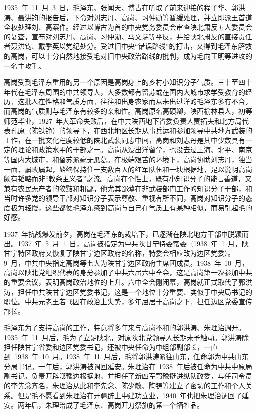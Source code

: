 1935~年~11~月~3~日，毛泽东、张闻天、博古在听取了前来迎接的程子华、郭洪涛、聂洪钧的报告后，下令对刘志丹、高岗、习仲勋等暂缓处理，并立即派王首道全权处理刘、高案件。经过以博古为首的中央党务委员会审查陕北肃反五人委员会的复查，宣布对刘志丹、高岗、习仲勋、马文瑞等平反，并给陕北肃反的直接责任者聂洪钧、戴季英以党纪处分。受过旧中央“错误路线”的打击，又得到毛泽东解救的高岗，可以十分自然地接受毛对旧中央政治路线的批判，成为毛向王明等进攻的一名主攻手。

高岗受到毛泽东重用的另一个原因是高岗身上的乡村小知识分子气质。三十至四十年代在毛泽东周围的中共领导人，大多数都有留苏或在国内大城市求学受教育的经历，这批人在性格和气质方面，往往和出身农家而从未出过洋的毛泽东多有不合，而高岗的气质则与毛泽东有较多的亲和性。高岗原名高硕卿，陕西榆林县人，初等师范毕业，1927~年大革命失败后，在中共陕西地下省委负责人贾拓夫和北方局代表孔原（陈铁铮）的领导下，在西北地区长期从事兵运和参加领导中共地方武装的工作，在一批文化程度较低的陕北武装同志中间，高岗和刘志丹是其中少数具有一定的理论和政策水平的干部之一。高岗从没出洋留学，也没去过上海、北平、南京等国内大城市，和留苏派毫无瓜葛。在极端艰苦的环境下，高岗协助刘志丹，独当一面，屡败屡起，始终保持住一支数百人的红军队伍和一块根据地，足以说明高岗颇有韬略而非“教条主义者”之流。高岗在个性上，既有小知识分子的能言善道，又兼有农民无产者的狡黠和粗鄙，他尤其鄙薄在非武装部门工作的知识分子干部，和当时许多党的领导干部对知识分子表示尊敬、重视有所不同，高岗对知识分子的态度极为轻慢，这些都使毛泽东感到高岗与自己在气质上有某种相似，而易引起毛的好感。

1937~年抗战爆发前夕，高岗在毛泽东的栽培下，已逐渐在陕北地方干部中脱颖而出。1937~年~5~月~1~日，高岗被指定为中共陕甘宁特委常委（1938~年~1~月，陕甘宁特区政府又恢复了陕甘宁边区政府的名称，特委会相应改为边区党委）。9~月，中共中央指定高岗等七人为陕甘宁边区政府主席团成员。1938~年~10~月，高岗以陕北党组织代表的身分参加了中共六届六中全会，这是高岗第一次参加中共的重要会议，表明高岗政治地位的上升。六中全会刚闭幕，高岗就正式取代了郭洪涛，担任中共陕甘宁边区党委书记，这是一个地位十分重要、类似于中央局书记的职位。中共元老王若飞因在政治上失势，多年屈居于高岗之下，担任边区党委宣传部长。

毛泽东为了支持高岗的工作，特意将多年来与高岗不和的郭洪涛、朱理治调开。1935~年~11~月后，毛为了立足陕北，对原陕北党领导人长期未予触动。郭洪涛除担任陕甘宁省委和边区党委书记，还被中央任命为中组部副部长，一直到~1938~年~10~月。1938~年~11~月后，毛将郭洪涛派往山东，任命郭为中共山东分局书记。一年后，郭洪涛被调回延安。朱理治在~1938~年后被任命为中共中原局副书记，负责开辟鄂豫边根据地，并担任了新四军鄂豫挺进纵队政委，与任司令员的李先念齐名，朱理治从此和李先念、陈少敏、陶铸等建立了密切的工作和个人关系。但是毛不愿看到朱理治在开疆辟土中建功立业，1940~年也把朱理治调回了延安。两年后，朱理治成了毛泽东、高岗开刀祭旗的第一个牺牲品。

